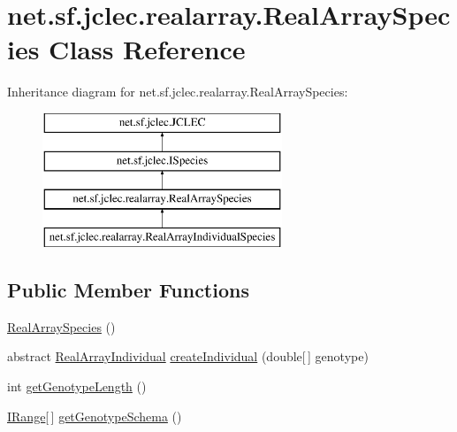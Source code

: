 \hypertarget{classnet_1_1sf_1_1jclec_1_1realarray_1_1_real_array_species}{\section{net.\-sf.\-jclec.\-realarray.\-Real\-Array\-Species Class Reference}
\label{classnet_1_1sf_1_1jclec_1_1realarray_1_1_real_array_species}
}
Inheritance diagram for net.\-sf.\-jclec.\-realarray.\-Real\-Array\-Species\-:\begin{figure}[H]
\begin{center}
\leavevmode
\includegraphics[height=4.000000cm]{classnet_1_1sf_1_1jclec_1_1realarray_1_1_real_array_species}
\end{center}
\end{figure}
\subsection*{Public Member Functions}
\begin{DoxyCompactItemize}
\item 
\hyperlink{classnet_1_1sf_1_1jclec_1_1realarray_1_1_real_array_species_a991b8004b99f149e1e17b64313fb2817}{Real\-Array\-Species} ()
\item 
abstract \hyperlink{classnet_1_1sf_1_1jclec_1_1realarray_1_1_real_array_individual}{Real\-Array\-Individual} \hyperlink{classnet_1_1sf_1_1jclec_1_1realarray_1_1_real_array_species_a99ad264b57f24b4f3723b4e8cab5dbb2}{create\-Individual} (double\mbox{[}$\,$\mbox{]} genotype)
\item 
int \hyperlink{classnet_1_1sf_1_1jclec_1_1realarray_1_1_real_array_species_a3bc5f25ac23dcb9535226f7731037393}{get\-Genotype\-Length} ()
\item 
\hyperlink{interfacenet_1_1sf_1_1jclec_1_1util_1_1range_1_1_i_range}{I\-Range}\mbox{[}$\,$\mbox{]} \hyperlink{classnet_1_1sf_1_1jclec_1_1realarray_1_1_real_array_species_a235140b906019c2dd9b986f90e55277e}{get\-Genotype\-Schema} ()
\end{DoxyCompactItemize}

